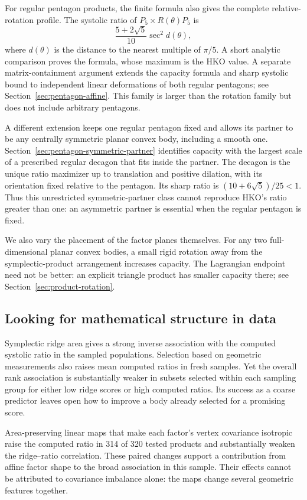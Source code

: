 For regular pentagon products, the finite formula also gives the complete
relative-rotation profile. The systolic ratio of
$P_5\times R(\theta)P_5$ is
\[
 \frac{5+2\sqrt5}{10}\sec^2 d(\theta),
\]
where $d(\theta)$ is the distance to the nearest multiple of $\pi/5$.
A short analytic comparison proves the formula, whose maximum is the HKO
value. A separate matrix-containment argument extends the capacity formula
and sharp systolic bound to independent linear deformations of both regular
pentagons; see Section~\ref{sec:pentagon-affine}. This family is larger
than the rotation family but does not include arbitrary pentagons.

A different extension keeps one regular pentagon fixed and allows its partner
to be any centrally symmetric planar convex body, including a smooth one.
Section~\ref{sec:pentagon-symmetric-partner} identifies capacity with the
largest scale of a prescribed regular decagon that fits inside the partner.
The decagon is the unique ratio maximizer up to translation and positive
dilation, with its orientation fixed relative to the pentagon. Its sharp ratio
is $(10+6\sqrt5)/25<1$. Thus this unrestricted symmetric-partner class
cannot reproduce HKO's ratio greater than one: an asymmetric partner is
essential when the regular pentagon is fixed.

We also vary the placement of the factor planes themselves. For any two
full-dimensional planar convex bodies, a small rigid rotation away from the
symplectic-product arrangement increases capacity. The Lagrangian endpoint
need not be better: an explicit triangle product has smaller capacity there;
see Section~\ref{sec:product-rotation}.

\subsection{Looking for mathematical structure in data}

Symplectic ridge area gives a strong inverse association with the computed
systolic ratio in the sampled populations. Selection based on geometric
measurements also raises mean computed ratios in fresh samples. Yet the
overall rank association is substantially weaker in subsets selected within each sampling group for
either low ridge scores or high computed ratios. Its success as a coarse
predictor leaves open how to improve a body already selected for a promising
score.

Area-preserving linear maps that make each factor's vertex covariance
isotropic raise the computed ratio in 314 of 320 tested products and
substantially weaken the ridge--ratio correlation. These paired changes
support a contribution from affine factor shape to the broad association
in this sample. Their effects cannot
be attributed to covariance imbalance alone: the maps change several
geometric features together.

